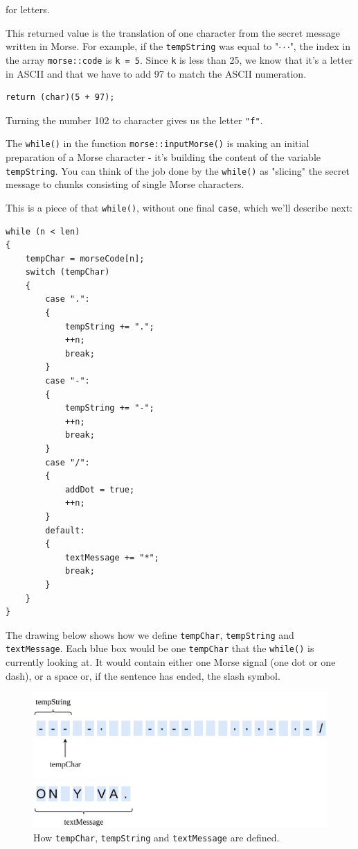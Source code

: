 \documentclass[12pt]{report}
\begin{document}
for letters.

This returned value is the translation of one character from the secret message written in Morse. For example, if the \verb|tempString| was equal to "$\cdot\cdot$\text{-}$\cdot$", the index in the array \verb|morse::code| is \verb|k = 5|. Since \verb|k| is less than 25, we know that it's a letter in ASCII and that we have to add 97 to match the ASCII numeration. 

\begin{lstlisting}
return (char)(5 + 97);
\end{lstlisting}

Turning the number 102 to character gives us the letter \verb|"f"|.

The \verb|while()| in the function  \verb|morse::inputMorse()| is making an initial preparation of a Morse character - it's building the content of the variable \verb|tempString|. You can think of the job done by the \verb|while()| as "slicing" the secret message to chunks consisting of single Morse characters.

This is a piece of that \verb|while()|, without one final \verb|case|, which we'll describe next:

\begin{lstlisting}
while (n < len)
{
	tempChar = morseCode[n];
	switch (tempChar)
	{
		case ".":
		{
			tempString += ".";
			++n;
			break;
		}
		case "-":
		{
			tempString += "-";
			++n;
			break;
		}
		case "/":
		{
			addDot = true;
			++n;
		}
		default:
		{
			textMessage += "*";
			break;
		}
	}
}
\end{lstlisting}

The drawing below shows how we define \verb|tempChar|, \verb|tempString| and \verb|textMessage|. Each blue box would be one \verb|tempChar| that the \verb|while()| is currently looking at. It would contain either one Morse signal (one dot or one dash), or a space or, if the sentence has ended, the slash symbol.

\begin{figure}[H]
\centering\includegraphics[width=14.5cm]{temp_string}
\caption{How \texttt{tempChar}, \texttt{tempString} and \texttt{textMessage} are defined.}
\label{fig:temp_char}
\end{figure}
\end{document}
